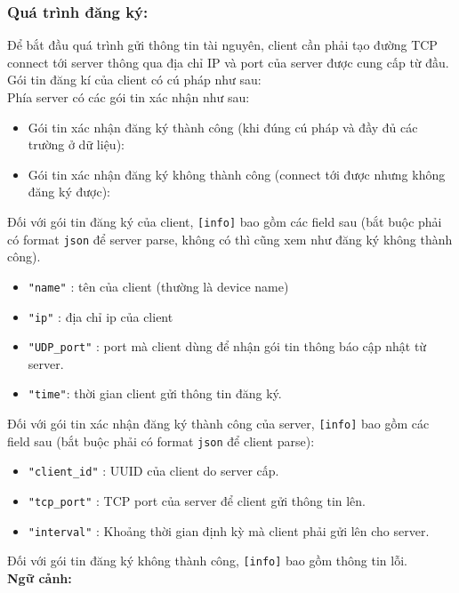\documentclass[a4paper,11pt]{extarticle}
\begin{document}
\subsubsection{Quá trình đăng ký:}
Để bắt đầu quá trình gửi thông tin tài nguyên, client cần phải tạo đường TCP connect tới server thông qua địa chỉ IP và port của server được cung cấp từ đầu. \\
Gói tin đăng kí của client có cú pháp như sau:  \\
Phía server có các gói tin xác nhận như sau:
\begin{itemize}
    \item Gói tin xác nhận đăng ký thành công (khi đúng cú pháp và đầy đủ các trường ở dữ liệu): 
    \item Gói tin xác nhận đăng ký không thành công (connect tới được nhưng không đăng ký được):
\end{itemize}
Đối với gói tin đăng ký của client, \texttt{[info]} bao gồm các field sau (bắt buộc phải có format \texttt{json} để server parse, không có thì cũng xem như đăng ký không thành công).
\begin{itemize}[noitemsep]
    \item \texttt{"name"} : tên của client (thường là device name)
    \item \texttt{"ip"} : địa chỉ ip của client
    \item \texttt{"UDP\_port"} : port mà client dùng để nhận gói tin thông báo cập nhật từ server.
    \item \texttt{"time"}: thời gian client gửi thông tin đăng ký.
\end{itemize}
Đối với gói tin xác nhận đăng ký thành công của server, \texttt{[info]} bao gồm các field sau (bắt buộc phải có format \texttt{json} để client parse):
\begin{itemize}[noitemsep]
    \item \texttt{"client\_id"} : UUID của client do server cấp.
    \item \texttt{"tcp\_port"} : TCP port của server để client gửi thông tin lên.
    \item \texttt{"interval"} : Khoảng thời gian định kỳ mà client phải gửi lên cho server.
\end{itemize}
Đối với gói tin đăng ký không thành công, \texttt{[info]} bao gồm thông tin lỗi. \\
\textbf{Ngữ cảnh:} \\
\end{document}
